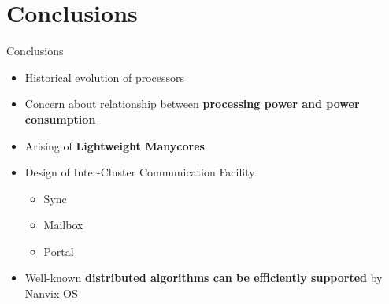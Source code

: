 \section{Conclusions}

	\begin{frame}[fragile]{Conclusions}
		\begin{itemize}
			\item Historical evolution of processors
			\item Concern about relationship between \textbf{processing power and power consumption}
			\item Arising of \textbf{Lightweight Manycores}
			\item Design of Inter-Cluster Communication Facility
			\begin{itemize}
				\item Sync
				\item Mailbox
				\item Portal
			\end{itemize}
			\item Well-known \textbf{distributed algorithms can be efficiently supported} by Nanvix OS 
		\end{itemize}
		
	\end{frame}


